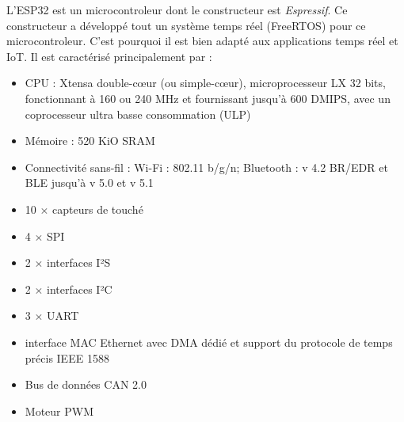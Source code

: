 L'ESP32 est un microcontroleur dont le constructeur est \textit{Espressif}. Ce constructeur a développé tout un système temps réel (FreeRTOS) pour ce microcontroleur. C'est pourquoi il est bien adapté aux applications temps réel et IoT. Il est caractérisé principalement par :
\begin{itemize}
  \item CPU : Xtensa double-cœur (ou simple-cœur), microprocesseur LX 32 bits, fonctionnant à 160 ou 240 MHz et fournissant jusqu'à 600 DMIPS, avec un
  coprocesseur ultra basse consommation (ULP)
  \item Mémoire : 520 KiO SRAM
  \item Connectivité sans-fil : Wi-Fi : 802.11 b/g/n;
  Bluetooth : v 4.2 BR/EDR et BLE jusqu'à v 5.0 et v 5.1
  \item 10 $\times$ capteurs de touché
  \item 4 $\times$ SPI
  \item 2 $\times$ interfaces I²S
  \item 2 $\times$ interfaces I²C
  \item 3 $\times$ UART
  \item interface MAC Ethernet avec DMA dédié et support du protocole de temps précis IEEE 1588
  \item Bus de données CAN 2.0
  \item Moteur PWM
\end{itemize}